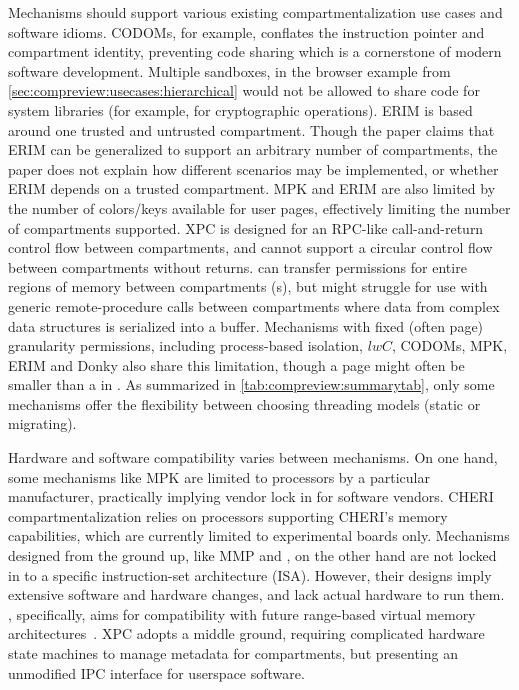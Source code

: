 Mechanisms should support various existing compartmentalization
use cases and software idioms.
CODOMs, for example, conflates the instruction pointer and compartment
identity, preventing code sharing which is a cornerstone of modern
software development.
Multiple sandboxes, in the browser example from 
\autoref{sec:compreview:usecases:hierarchical} would not be allowed to
share code for system libraries (for example, for cryptographic operations).
ERIM is based around one trusted and untrusted compartment.
Though the paper claims that ERIM can be generalized to support an arbitrary
number of compartments, the paper does not explain how different scenarios
may be implemented, or whether ERIM depends on a trusted compartment.
MPK and ERIM are also limited by the number of colors/keys available for 
user pages, effectively limiting the number of compartments supported.
XPC is designed for an RPC-like call-and-return control flow between
compartments, and cannot support a circular control flow between compartments
without returns.
\seccells can transfer permissions for entire regions of memory between
compartments (\cell{}s), but might struggle for use with generic
remote-procedure calls between compartments where data from complex
data structures is serialized into a buffer.
Mechanisms with fixed (often page) granularity permissions, including
process-based isolation, $lwC$, CODOMs, MPK, ERIM and Donky also share
this limitation, though a page might often be smaller than a 
\cell{} in \seccells.
As summarized in \autoref{tab:compreview:summarytab}, only some mechanisms
offer the flexibility between choosing threading models (static or migrating).

Hardware and software compatibility varies between mechanisms. 
On one hand, some mechanisms like MPK are limited to processors by a 
particular manufacturer, practically implying vendor lock in for 
software vendors.
CHERI compartmentalization relies on processors supporting CHERI's
memory capabilities, which are currently limited to experimental boards only.
Mechanisms designed from the ground up, like MMP and \seccells, on the other
hand are not locked in to a specific instruction-set architecture (ISA).
However, their designs imply extensive software and hardware changes,
and lack actual hardware to run them.
\seccells, specifically, aims for compatibility with future range-based
virtual memory architectures~\cite{0003BOBFP21midgard}.
XPC adopts a middle ground, requiring complicated hardware state machines to
manage metadata for compartments, but presenting an unmodified IPC
interface for userspace software.


